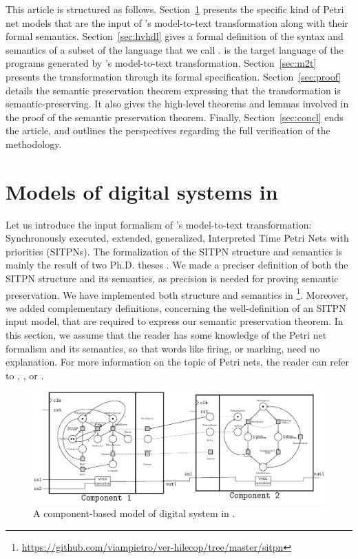 \documentclass[pdflatex,sn-mathphys]{sn-jnl}%
\theoremstyle{thmstyleone}%
\theoremstyle{thmstyletwo}%
\theoremstyle{thmstylethree}%
\begin{document}
This article is structured as
follows. Section~\ref{sec:hilecop-models} presents the specific kind
of Petri net models that are the input of \hilecop{}'s model-to-text
transformation along with their formal semantics.
Section~\ref{sec:hvhdl} gives a formal definition of the syntax and
semantics of a subset of the \vhdl{} language that we call
\hvhdl{}. \hvhdl{} is the target language of the programs generated by
\hilecop{}'s model-to-text transformation.  Section~\ref{sec:m2t}
presents the transformation through its formal specification.
Section~\ref{sec:proof} details the semantic preservation theorem
expressing that the \hilecop{} transformation is semantic-preserving.
It also gives the high-level theorems and lemmas involved in the proof
of the semantic preservation theorem.  Finally,
Section~\ref{sec:concl} ends the article, and outlines the
perspectives regarding the full verification of the \hilecop{}
methodology.

\section{Models of digital systems in \hilecop{}}
\label{sec:hilecop-models}

Let us introduce the input formalism of \hilecop{}'s model-to-text
transformation: Synchronously executed, extended, generalized,
Interpreted Time Petri Nets with priorities (SITPNs). The
formalization of the SITPN structure and semantics is mainly the
result of two Ph.D. theses \cite{Leroux2014,Merzoug2018}. We made a
preciser definition of both the SITPN structure and its semantics, as
precision is needed for proving semantic preservation. We have
implemented both structure and semantics in
\coq{}\footnote{\url{https://github.com/viampietro/ver-hilecop/tree/master/sitpn}}. Moreover,
we added complementary definitions, concerning the well-definition of
an SITPN input model, that are required to express our semantic
preservation theorem. In this section, we assume that the reader has
some knowledge of the Petri net formalism and its semantics, so that
words like firing, or marking, need no explanation. For more
information on the topic of Petri nets, the reader can refer to
\cite{David1994}, \cite{Murata1989}, or \cite{Diaz2001}.

\begin{figure}[H]
\centering
\includegraphics[keepaspectratio=true,width=\textwidth]{abs-model.eps}
\caption[An example of model of digital system in \hilecop{}.]{A
  component-based model of digital system in \hilecop{}.}
\label{fig:abs-model}
\end{figure}
\end{document}

